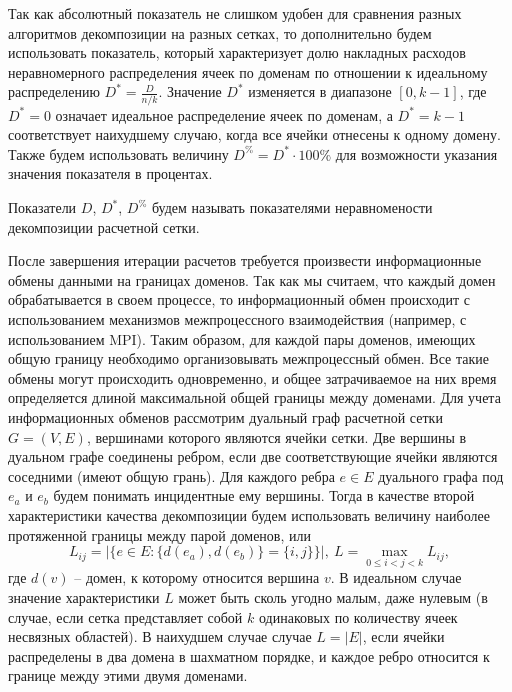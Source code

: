 Так как абсолютный показатель не слишком удобен для сравнения разных алгоритмов декомпозиции на разных сетках, то дополнительно будем использовать показатель, который характеризует долю накладных расходов неравномерного распределения ячеек по доменам по отношении к идеальному распределению $D^{*} = \frac{D}{n / k}$.
Значение $D^{*}$ изменяется в диапазоне $[0, k - 1]$, где $D^{*} = 0$ означает идеальное распределение ячеек по доменам, а $D^{*} = k - 1$ соответствует наихудшему случаю, когда все ячейки отнесены к одному домену.
Также будем использовать величину $D^{\%} = D^{*} \cdot 100\%$ для возможности указания значения показателя в процентах.

\begin{definition}
Показатели $D$, $D^{*}$, $D^{\%}$ будем называть показателями неравномености декомпозиции расчетной сетки.
\end{definition} 

После завершения итерации расчетов требуется произвести информационные обмены данными на границах доменов.
Так как мы считаем, что каждый домен обрабатывается в своем процессе, то информационный обмен происходит с использованием механизмов межпроцессного взаимодействия (например, с использованием MPI).
Таким образом, для каждой пары доменов, имеющих общую границу необходимо организовывать межпроцессный обмен.
Все такие обмены могут происходить одновременно, и общее затрачиваемое на них время определяется длиной максимальной общей границы между доменами.
Для учета информационных обменов рассмотрим дуальный граф расчетной сетки $G = (V, E)$, вершинами которого являются ячейки сетки.
Две вершины в дуальном графе соединены ребром, если две соответствующие ячейки являются соседними (имеют общую грань).
Для каждого ребра $e \in E$ дуального графа под $e_a$ и $e_b$ будем понимать инцидентные ему вершины.
Тогда в качестве второй характеристики качества декомпозиции будем использовать величину наиболее протяженной границы между парой доменов, или
\begin{equation}
L_{ij} = \left| \{ e \in E: \{ d(e_a), d(e_b) \} = \{ i, j \} \} \right|, \ L = \max_{0 \le i < j < k}{L_{ij}},
\end{equation}
где $d(v)$ -- домен, к которому относится вершина $v$.
В идеальном случае значение характеристики $L$ может быть сколь угодно малым, даже нулевым (в случае, если сетка представляет собой $k$ одинаковых по количеству ячеек несвязных областей).
В наихудшем случае случае $L = |E|$, если ячейки распределены в два домена в шахматном порядке, и каждое ребро относится к границе между этими двумя доменами.

